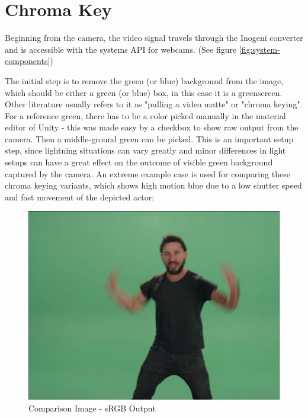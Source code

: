 %
\section{Chroma Key}
\label{sec:chromakey}

Beginning from the camera, the video signal travels through the Inogeni 
converter and is accessible with the systems API for webcams. 
(See figure \ref{fig:system-components})

The initial step is to remove the green (or blue) background from the image, 
which should be either a green (or blue) box, in this case it is a greenscreen. 
Other literature usually refers to it as "pulling a video matte" or "chroma 
keying". For a reference green, there has to be a color picked manually in the 
material editor of Unity - this was made easy by a checkbox to show raw output 
from the camera. Then a middle-ground green can be picked. This is an important 
setup step, since lightning situations can vary greatly and minor differences 
in light setups can have a great effect on the outcome of visible green 
background captured by the camera.
\newline
An extreme example case is used for comparing these chroma keying variants, 
which shows high motion blue due to a low shutter speed and fast movement of 
the depicted actor:

\begin{figure}[htb]
	\includegraphics[width=\textwidth]{_raw_resources/Comparison_Example.png}
	\caption{Comparison Image \cite{vimeo:shia:2015} - sRGB Output}
	\label{fig:chroma:color}
\end{figure}

